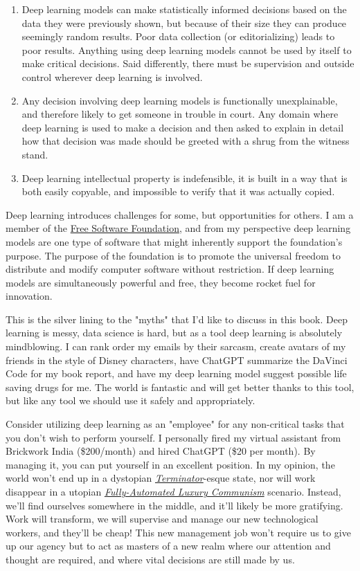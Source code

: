 \begin{enumerate}
\item Deep learning models can make statistically informed decisions based on the data they were previously shown, but because of their size they can produce seemingly random results. Poor data collection (or editorializing) leads to poor results. Anything using deep learning models cannot be used by itself to make critical decisions. Said differently, there must be supervision and outside control wherever deep learning is involved.
\item Any decision involving deep learning models is functionally unexplainable, and therefore likely to get someone in trouble in court. Any domain where deep learning is used to make a decision and then asked to explain in detail how that decision was made should be greeted with a shrug from the witness stand.
\item Deep learning intellectual property is indefensible, it is built in a way that is both easily copyable, and impossible to verify that it was actually copied.
\end{enumerate}

Deep learning introduces challenges for some, but opportunities for others. I am a member of the \href{https://www.fsf.org/}{Free Software Foundation}, and from my perspective deep learning models are one type of software that might inherently support the foundation's purpose. The purpose of the foundation is to promote the universal freedom to distribute and modify computer software without restriction. If deep learning models are simultaneously powerful and free, they become rocket fuel for innovation. 

This is the silver lining to the "myths" that I'd like to discuss in this book. Deep learning is messy, data science is hard, but as a tool deep learning is absolutely mindblowing. I can rank order my emails by their sarcasm, create avatars of my friends in the style of Disney characters, have ChatGPT summarize the DaVinci Code for my book report, and have my deep learning model suggest possible life saving drugs for me. The world is fantastic and will get better thanks to this tool, but like any tool we should use it safely and appropriately.  

Consider utilizing deep learning as an "employee" for any non-critical tasks that you don't wish to perform yourself. I personally fired my virtual assistant from Brickwork India (\$200/month) and hired ChatGPT (\$20 per month). By managing it, you can put yourself in an excellent position. In my opinion, the world won't end up in a dystopian \href{https://en.wikipedia.org/wiki/The_Terminator}{\textit{Terminator}}-esque state, nor will work disappear in a utopian \href{https://en.wikipedia.org/wiki/Fully_Automated_Luxury_Communism}{\textit{Fully-Automated Luxury Communism}} scenario. Instead, we'll find ourselves somewhere in the middle, and it'll likely be more gratifying. Work will transform, we will supervise and manage our new technological workers, and they'll be cheap! This new management job won't require us to give up our agency but to act as masters of a new realm where our attention and thought are required, and where vital decisions are still made by us.


